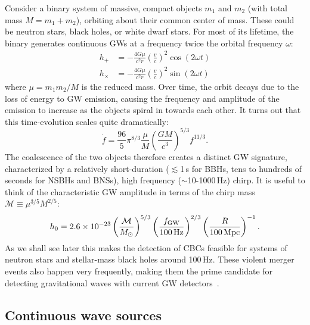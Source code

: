 Consider a binary system of massive, compact objects $m_1$ and $m_2$ (with total mass $M = m_1 + m_2$), orbiting about their common center of mass.
These could be neutron stars, black holes, or white dwarf stars.
For most of its lifetime, the binary generates continuous \acp{GW} at a frequency twice the orbital frequency $\omega$:
\begin{align}
	h_+ &= -\frac{4 G \mu}{c^2 r} \left(\frac{v}{c}\right)^2 \cos (2 \omega t) \\
	h_{\times} &= -\frac{4 G \mu}{c^2 r} \left(\frac{v}{c}\right)^2 \sin (2 \omega t)
\end{align}
where $\mu = m_1 m_2 / M$ is the reduced mass.
Over time, the orbit decays due to the loss of energy to \ac{GW} emission, causing the frequency and amplitude of the emission to increase as the objects spiral in towards each other.
It turns out that this time-evolution scales quite dramatically:
\begin{equation}
	\dot{f} = \frac{96}{5}\pi^{8/3} \frac{\mu}{M} \left(\frac{G M}{c^3}\right)^{5/3} f^{11/3}.
\end{equation}
The coalescence of the two objects therefore creates a distinct \ac{GW} signature, characterized by a relatively short-duration ($\lesssim$1\,s for \acp{BBH}, tens to hundreds of seconds for \acp{NSBH} and \acp{BNS}), high frequency ($\sim$10-1000\,Hz) chirp.
It is useful to think of the characteristic GW amplitude in terms of the chirp mass $\mathcal{M} \equiv \mu^{3/5} M^{2/5}$:
\begin{equation}
	h_0 = 2.6 \times 10^{-23} \left( \frac{\mathcal{M}}{M_{\odot}} \right)^{5/3} \left( \frac{f_{\mathrm{GW}}}{100\,\mathrm{Hz}} \right)^{2/3} \left( \frac{R}{100\,\mathrm{Mpc}} \right)^{-1}.
\end{equation}
As we shall see later this makes the detection of \acp{CBC} feasible for systems of neutron stars and stellar-mass black holes around 100\,Hz.
These violent merger events also happen very frequently, making them the prime candidate for detecting gravitational waves with current GW detectors~\cite{aLIGO_prospects}.


\subsection{Continuous wave sources}

